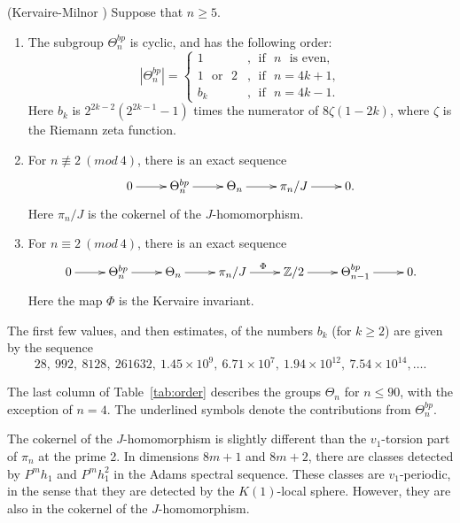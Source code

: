 \begin{thm}\label{km}(Kervaire-Milnor \cite{KervaireMilnor})
Suppose that $n\geq 5$.
\begin{enumerate}
\item
The subgroup $\Theta_n^{bp}$ is cyclic, and has the following order:
\begin{equation*}
|\Theta_n^{bp}|=\left\{
\begin{split}
1 & , ~~\text{if~~}n\text{~~is even,} \\
1 \text{~~or~~} 2 & , ~~\text{if~~}n = 4k+1,\\
b_k & , ~~\text{if~~}n = 4k-1.
\end{split}
\right.
\end{equation*}
Here $b_k$ is $2^{2k-2}(2^{2k-1}-1)$ times the numerator of $8\zeta(1-2k)$,
where $\zeta$ is the Riemann zeta function.\\
\item
For $n \not\equiv 2 ~(mod ~4)$, there is an exact sequence
\begin{displaymath}
    \xymatrix{
   0 \ar[r] & \Theta_n^{bp} \ar[r] & \Theta_n \ar[r] & \pi_n/J \ar[r] & 0.
    }
\end{displaymath}
Here $\pi_n/J$ is the cokernel of the $J$-homomorphism.\\

\item
For $n \equiv 2 ~(mod ~4)$, there is an exact sequence
\begin{displaymath}
    \xymatrix{
   0 \ar[r] & \Theta_n^{bp} \ar[r] & \Theta_n \ar[r] & \pi_n/J \ar[r]^\Phi & \mathbb{Z}/2 \ar[r] & \Theta_{n-1}^{bp} \ar[r] & 0.
    }
\end{displaymath}
Here the map $\Phi$ is the Kervaire invariant.
\end{enumerate}
\end{thm}
The first few values, and then estimates, of the numbers $b_k$
(for $k \geq 2$)
are given by the sequence
$$28, \ 992, \ 8128, \ 261632, \ 1.45\times 10^9, \ 6.71\times 10^7, \ 1.94\times 10^{12}, \ 7.54\times 10^{14}, \ldots .$$

\begin{thm}\label{thm homotopy sphere}
The last column of Table~\ref{tab:order}
describes the groups $\Theta_n$ for $n \leq 90$, with the exception of $n=4$. 
The underlined symbols denote the contributions from $\Theta_n^{bp}$.
\end{thm}
 
The cokernel of the $J$-homomorphism is slightly
different than the $v_1$-torsion part of $\pi_n$ at the prime 2. 
In dimensions $8m+1$ and $8m+2$, there are classes detected by $P^m h_1$ 
and $P^m h_1^2$ in the Adams spectral sequence. 
These classes are $v_1$-periodic, in the sense that
they are detected by the $K(1)$-local sphere. 
However, they are also in the cokernel of the $J$-homomorphism.  

